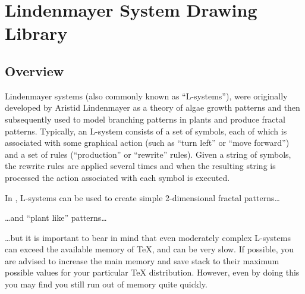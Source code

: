 %
%
%


\section{Lindenmayer System Drawing Library}

\subsection{Overview}

Lindenmayer systems (also commonly known as ``L-systems''), were originally
developed by Aristid Lindenmayer as a theory of algae growth patterns and then
subsequently used to model branching patterns in plants and produce fractal
patterns. Typically, an L-system consists of a set of symbols, each of which is
associated with some graphical action (such as ``turn left'' or ``move
forward'') and a set of rules (``production'' or ``rewrite'' rules). Given a
string of symbols, the rewrite rules are applied several times and when the
resulting string is processed the action associated with each symbol is
executed.

In \pgfname, L-systems can be used to create simple 2-dimensional fractal
patterns\ldots
%
\begin{codeexample}[
    preamble={\usetikzlibrary{lindenmayersystems}},
    pre={\expandafter\let\csname pgf@lsystem@Koch curve\endcsname=\relax},
]
\end{codeexample}
%
\noindent\ldots and ``plant like'' patterns\ldots
%
\begin{codeexample}[preamble={\usetikzlibrary{lindenmayersystems}}]
\end{codeexample}
%
\noindent \ldots but it is important to bear in mind that even moderately
complex L-systems can exceed the available memory of \TeX, and can be very
slow. If possible, you are advised to increase the main memory and save stack
to their maximum possible values for your particular \TeX{} distribution.
However, even by doing this you may find you still run out of memory quite
quickly.

